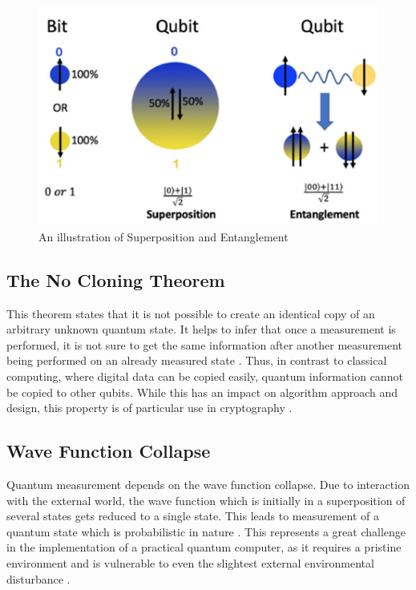 \documentclass[conference]{IEEEtran}
\begin{document}
\begin{figure}[htbp]
	\centerline{\includegraphics[scale=0.9]{ent.png}}
	\caption{An illustration of Superposition and Entanglement \cite{b16}}
	\label{fig6}
\end{figure}

\subsection{The No Cloning Theorem}
This theorem states that it is not possible to create an identical copy of an arbitrary unknown quantum state. It helps to infer that once a measurement is performed, it is not sure to get the same information after another measurement being performed on an already measured state \cite{b19}. Thus, in contrast to classical computing, where digital data can be copied easily, quantum information cannot be copied to other qubits. While this has an impact on algorithm approach and design, this property is of particular use in cryptography \cite{b15}.

\subsection{Wave Function Collapse}
Quantum measurement depends on the wave function collapse. Due to interaction with the external world, the wave function which is initially in a superposition of several states gets reduced to a single state. This leads to measurement of a quantum state which is probabilistic in nature \cite{b19}. This represents a great challenge in the implementation of a practical quantum computer, as it requires a pristine environment and is vulnerable to even the slightest external environmental disturbance \cite{b19}.
\end{document}
